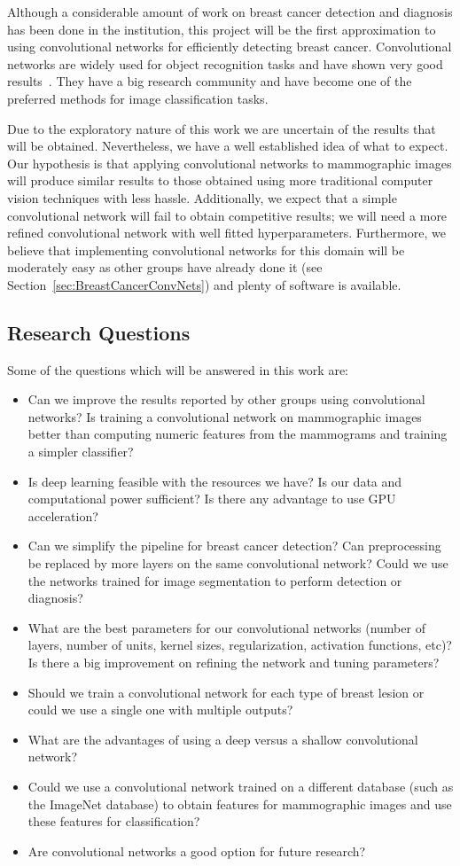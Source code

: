 Although a considerable amount of work on breast cancer detection and diagnosis has been done in the institution, this project will be the first approximation to using convolutional networks for efficiently detecting breast cancer. Convolutional networks are widely used for object recognition tasks and have shown very good results~\cite{Russakovsky2015, Taigman2014, Dieleman2015}. They have a big research community and have become one of the preferred methods for image classification tasks.

Due to the exploratory nature of this work we are uncertain of the results that will be obtained. Nevertheless, we have a well established idea of what to expect. Our hypothesis is that applying convolutional networks to mammographic images will produce similar results to those obtained using more traditional computer vision techniques with less hassle. Additionally, we expect that a simple convolutional network will fail to obtain competitive results; we will need a more refined convolutional network with well fitted hyperparameters. Furthermore, we believe that implementing convolutional networks for this domain will be moderately easy as other groups have already done it (see Section~\ref{sec:BreastCancerConvNets}) and plenty of software is available.

\subsection{Research Questions}
Some of the questions which will be answered in this work are:
\begin{itemize} 
	\item Can we improve the results reported by other groups using convolutional networks? Is training a convolutional network on mammographic images better than computing numeric features from the mammograms and training a simpler classifier?
	\item Is deep learning feasible with the resources we have? Is our data and computational power sufficient? Is there any advantage to use GPU acceleration?
	\item Can we simplify the pipeline for breast cancer detection? Can preprocessing be replaced by more layers on the same convolutional network? Could we use the networks trained for image segmentation to perform detection or diagnosis?
	\item What are the best parameters for our convolutional networks (number of layers, number of units, kernel sizes, regularization, activation functions, etc)? Is there a big improvement on refining the network and tuning parameters?
	\item Should we train a convolutional network for each type of breast lesion or could we use a single one with multiple outputs?
	\item What are the advantages of using a deep versus a shallow convolutional network? 
	\item Could we use a convolutional network trained on a different database (such as the ImageNet database) to obtain features for mammographic images and use these features for classification?
	\item Are convolutional networks a good option for future research?
\end{itemize}
